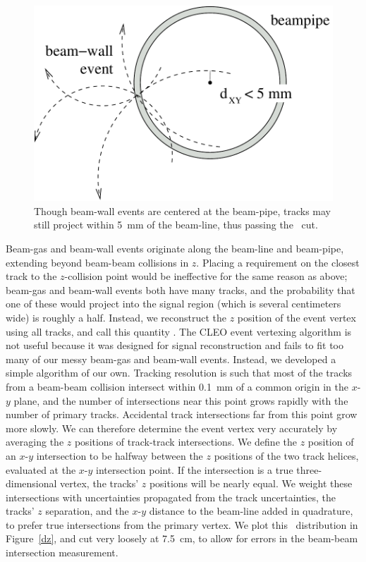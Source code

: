 \documentclass{cornell}
\begin{document}
\begin{figure}[t]
  \begin{center}
    \includegraphics[width=0.6\linewidth]{plots/biastowardzero}
  \end{center}
  \caption{\label{biastowardzero} Though beam-wall events are centered
  at the beam-pipe, tracks may still project within 5~mm of the
  beam-line, thus passing the \dxy\ cut.}
\end{figure}

Beam-gas and beam-wall events originate along the beam-line and
beam-pipe, extending beyond beam-beam collisions in $z$.  Placing a
requirement on the closest track to the $z$-collision point would be
ineffective for the same reason as above; beam-gas and beam-wall
events both have many tracks, and the probability that one of these
would project into the signal region (which is several centimeters
wide) is roughly a half.  Instead, we reconstruct the $z$ position of
the event vertex using all tracks, and call this quantity \dz.  The
CLEO event vertexing algorithm is not useful because it was designed
for signal reconstruction and fails to fit too many of our messy
beam-gas and beam-wall events.  Instead, we developed a simple
algorithm of our own.  Tracking resolution is such that most of the
tracks from a beam-beam collision intersect within 0.1~mm of a common
origin in the $x$-$y$ plane, and the number of intersections near this
point grows rapidly with the number of primary tracks.  Accidental
track intersections far from this point grow more slowly.  We can
therefore determine the event vertex very accurately by averaging the
$z$ positions of track-track intersections.  We define the $z$
position of an $x$-$y$ intersection to be halfway between the $z$
positions of the two track helices, evaluated at the $x$-$y$
intersection point.  If the intersection is a true three-dimensional
vertex, the tracks' $z$ positions will be nearly equal.  We weight
these intersections with uncertainties propagated from the track
uncertainties, the tracks' $z$ separation, and the $x$-$y$ distance to
the beam-line added in quadrature, to prefer true intersections from
the primary vertex.  We plot this \dz\ distribution in Figure~\ref{dz}, and cut very loosely at 7.5~cm, to allow for errors in the
beam-beam intersection measurement.
\end{document}

